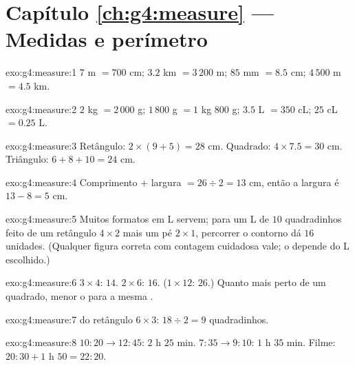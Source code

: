 \section*{Capítulo \ref{ch:g4:measure} --- Medidas e perímetro}

\begin{solution}{exo:g4:measure:1}
$7$ m $= 700$ cm; \quad $3.2$ km $= 3\,200$ m; \quad
$85$ mm $= 8.5$ cm; \quad $4\,500$ m $= 4.5$ km.
\end{solution}

\begin{solution}{exo:g4:measure:2}
$2$ kg $= 2\,000$ g; \quad $1\,800$ g $= 1$ kg $800$ g; \quad
$3.5$ L $= 350$ cL; \quad $25$ cL $= 0.25$ L.
\end{solution}

\begin{solution}{exo:g4:measure:3}
Retângulo: $2 \times (9 + 5) = 28$ cm. Quadrado:
$4 \times 7.5 = 30$ cm. Triângulo: $6 + 8 + 10 = 24$ cm.
\end{solution}

\begin{solution}{exo:g4:measure:4}
Comprimento $+$ largura $= 26 \div 2 = 13$ cm, então a largura é
$13 - 8 = 5$ cm.
\end{solution}

\begin{solution}{exo:g4:measure:5}
Muitos formatos em L servem; para um L de $10$ quadradinhos feito de
um retângulo $4 \times 2$ mais um pé $2 \times 1$, percorrer o
contorno dá $16$ unidades. (Qualquer figura correta com contagem
cuidadosa vale; o  depende do L escolhido.)
\end{solution}

\begin{solution}{exo:g4:measure:6}
$3 \times 4$:  $14$. $2 \times 6$:  $16$.
($1 \times 12$:  $26$.) Quanto mais perto de um quadrado,
menor o  para a mesma .
\end{solution}

\begin{solution}{exo:g4:measure:7}
 do retângulo $6 \times 3$: $18 \div 2 = 9$ quadradinhos.
\end{solution}

\begin{solution}{exo:g4:measure:8}
$10{:}20 \to 12{:}45$: $2$ h $25$ min. $7{:}35 \to 9{:}10$:
$1$ h $35$ min. Filme: $20{:}30 + 1$ h $50 = 22{:}20$.
\end{solution}

